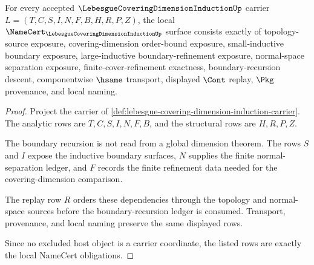 \begin{theorem}
\label{thm:lebesgue-covering-dimension-induction-namecert-obligations}
For every accepted $\LebesgueCoveringDimensionInductionUp$ carrier $L=(T,C,S,I,N,F,B,H,R,P,Z)$, the local $\NameCert_{\LebesgueCoveringDimensionInductionUp}$ surface consists exactly of topology-source exposure, covering-dimension order-bound exposure, small-inductive boundary exposure, large-inductive boundary-refinement exposure, normal-space separation exposure, finite-cover-refinement exactness, boundary-recursion descent, componentwise $\hsame$ transport, displayed $\Cont$ replay, $\Pkg$ provenance, and local naming.
\end{theorem}
\begin{proof}
Project the carrier of \autoref{def:lebesgue-covering-dimension-induction-carrier}. The analytic rows are $T,C,S,I,N,F,B$, and the structural rows are $H,R,P,Z$.

The boundary recursion is not read from a global dimension theorem. The rows $S$ and $I$ expose the inductive boundary surfaces, $N$ supplies the finite normal-separation ledger, and $F$ records the finite refinement data needed for the covering-dimension comparison.

The replay row $R$ orders these dependencies through the topology and normal-space sources before the boundary-recursion ledger is consumed. Transport, provenance, and local naming preserve the same displayed rows.

Since no excluded host object is a carrier coordinate, the listed rows are exactly the local NameCert obligations.
\end{proof}

